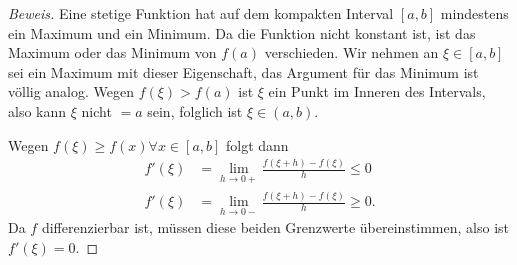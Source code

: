 \begin{proof}[Beweis]
Eine stetige Funktion hat auf dem kompakten Interval $[a,b]$ mindestens
ein Maximum und ein Minimum.
Da die Funktion nicht konstant ist, ist das Maximum oder das Minimum
von $f(a)$ verschieden.
Wir nehmen an $\xi\in[a,b]$ sei ein Maximum mit dieser Eigenschaft,
das Argument für das Minimum ist völlig analog.
Wegen $f(\xi)>f(a)$ ist $\xi$ ein Punkt im Inneren des Intervals,
also kann $\xi$ nicht $=a$ sein, folglich ist $\xi\in(a,b)$.

Wegen $f(\xi) \ge f(x)\forall x\in[a,b]$
folgt dann
\begin{align*}
f'(\xi) &= \lim_{h\to 0+}  \frac{f(\xi+h)-f(\xi)}{h} \le 0
\\
f'(\xi) &= \lim_{h\to 0-}  \frac{f(\xi+h)-f(\xi)}{h} \ge 0.
\end{align*}
Da $f$ differenzierbar ist, müssen diese beiden Grenzwerte übereinstimmen,
also ist $f'(\xi)=0$.
\end{proof}


